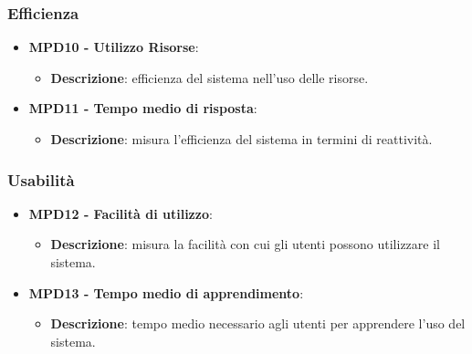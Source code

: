 \documentclass[10pt]{article}
\begin{document}
\begin{justify}
\subsubsection{Efficienza}
\begin{itemize}
    \item \textbf{MPD10 - Utilizzo Risorse}:
    \begin{itemize}
        \item \textbf{Descrizione}: efficienza del sistema nell'uso delle risorse.
    \end{itemize}
    \item \textbf{MPD11 - Tempo medio di risposta}:
    \begin{itemize}
        \item \textbf{Descrizione}: misura l'efficienza del sistema in termini di reattività.
    \end{itemize}
\end{itemize}

\subsubsection{Usabilità}
\begin{itemize}
    \item \textbf{MPD12 - Facilità di utilizzo}:
        \begin{itemize}
            \item \textbf{Descrizione}:  misura la facilità con cui gli utenti possono utilizzare il sistema.
        \end{itemize}
    \item \textbf{MPD13 - Tempo medio di apprendimento}:
        \begin{itemize}
            \item \textbf{Descrizione}: tempo medio necessario agli utenti per apprendere l'uso del sistema.
        \end{itemize}
\end{itemize}


\end{justify}
\end{document}
